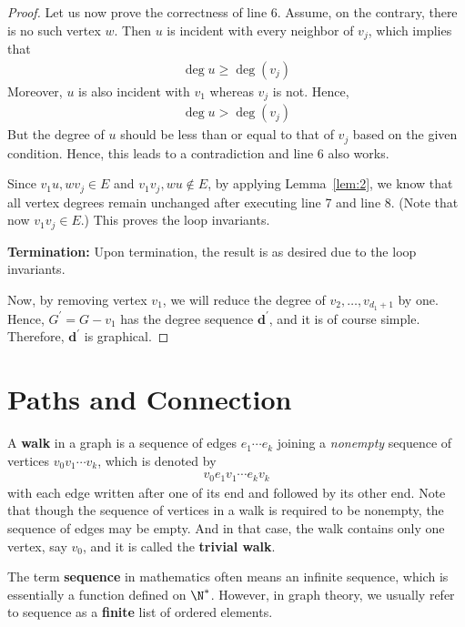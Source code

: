 \documentclass[thmcnt=section, 12pt, color=cyan]{my-elegantbook}
\begin{document}
\begin{proof}
	Let us now prove the correctness of line 6.
	Assume, on the contrary,
	there is no such vertex $w$.
	Then $u$ is incident with every neighbor of $v_j$,
	which implies that 
	\begin{align*}
		\deg{u} \geq \deg(v_j)
	\end{align*}
	Moreover, $u$ is also incident with $v_1$ whereas $v_j$ is not.
	Hence, 
	\begin{align*}
		\deg{u} > \deg(v_j)
	\end{align*}
	But the degree of $u$ should be less than or equal to 
	that of $v_j$ based on the given condition.
	Hence, this leads to a contradiction and 
	line 6 also works.

	Since $v_1 u, w v_j \in E$ and $v_1 v_j, w u \notin E$,
	by applying Lemma~\ref{lem:2},
	we know that all vertex degrees remain unchanged
	after executing line 7 and line 8.
	(Note that now $v_1 v_j \in E$.)
	This proves the loop invariants.

	\noindent\textbf{Termination:}
	Upon termination, the result is as desired
	due to the loop invariants.

	Now, by removing vertex $v_1$,
	we will reduce the degree of $v_2, \ldots, v_{d_1 + 1}$ by one.
	Hence, $G^\prime = G - v_1$ has the 
	degree sequence $\mathbf{d}^\prime$, and 
	it is of course simple.
	Therefore, $\mathbf{d}^\prime$ is graphical.
\end{proof}


\section{Paths and Connection}


A \textbf{walk} in a graph is a sequence of edges $e_1 \cdots e_k$ joining a \textit{nonempty} sequence of vertices $v_0 v_1 \cdots v_k$, which is denoted by 
\begin{align}
    v_0 e_1 v_1 \cdots e_k v_k 
    \label{eq:3}
\end{align}
with each edge written after one of its end and followed by its other end. Note that though the sequence of vertices in a walk is required to be nonempty, the sequence of edges may be empty. And in that case, the walk contains only one vertex, say $v_0$, and it is called the \textbf{trivial walk}.
\begin{note}
    The term \textbf{sequence} in mathematics often means an infinite sequence, which is essentially a function defined on $\N^\ast$. However, in graph theory, we usually refer to sequence as a \textbf{finite} list of ordered elements.
\end{note}
\end{document}
